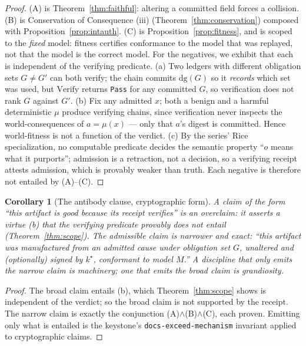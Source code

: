 \documentclass[11pt,oneside]{book}
\theoremstyle{definition}
\theoremstyle{plain}
\newtheorem{corollary}[theorem]{Corollary}
\theoremstyle{remark}
\newcommand{\muop}{\mu}                        %
\newcommand{\dg}{\mathrm{dg}}                   %
\newcommand{\code}[1]{\texttt{#1}}
\begin{document}
\begin{proof}
(A) is Theorem~\ref{thm:faithful}: altering a committed field forces a collision. (B) is
Conservation of Consequence (iii) (Theorem~\ref{thm:conservation}) composed with
Proposition~\ref{prop:intauth}. (C) is Proposition~\ref{prop:fitness}, and is scoped to the
\emph{fixed} model: fitness certifies conformance to the model that was replayed, not that the
model is the correct model. %
For the negatives, we exhibit that each is independent of the verifying predicate. (a) Two
ledgers with different obligation sets $G\ne G'$ can both verify; the chain commits $\dg(G)$
so it \emph{records} which set was used, but $\mathrm{Verify}$ returns \code{Pass} for any
committed $G$, so verification does not rank $G$ against $G'$. (b) Fix any admitted $x$; both a
benign and a harmful deterministic $\muop$ produce verifying chains, since verification never
inspects the world-consequences of $a=\muop(x)$ --- only that $a$'s digest is committed. %
Hence
world-fitness is not a function of the verdict. (c) By the series' Rice specialization, no
computable predicate decides the semantic property ``$o$ means what it purports''; admission is
a retraction, not a decision, so a verifying receipt attests admission, which is provably
weaker than truth. %
Each negative is therefore not entailed by (A)--(C). %
 \end{proof}

\begin{corollary}[The antibody clause, cryptographic form]\label{cor:antibody}
A claim of the form ``this artifact is \emph{good} because its receipt verifies'' is an
overclaim: it asserts a virtue (b) that the verifying predicate provably does not entail
(Theorem~\ref{thm:scope}). %
The admissible claim is narrower and exact: ``this artifact was
manufactured from an admitted cause under obligation set $G$, unaltered and (optionally)
signed by $k^{\star}$, conformant to model $M$.'' A discipline that only emits the narrow claim
is machinery; one that emits the broad claim is grandiosity. %
\end{corollary}

\begin{proof}
The broad claim entails (b), which Theorem~\ref{thm:scope} shows is independent of the verdict;
so the broad claim is not supported by the receipt. %
The narrow claim is exactly the conjunction
(A)$\wedge$(B)$\wedge$(C), each proven. %
Emitting only what is entailed is the keystone's
\code{docs-exceed-mechanism} invariant applied to cryptographic claims. %
 \end{proof}
\end{document}
